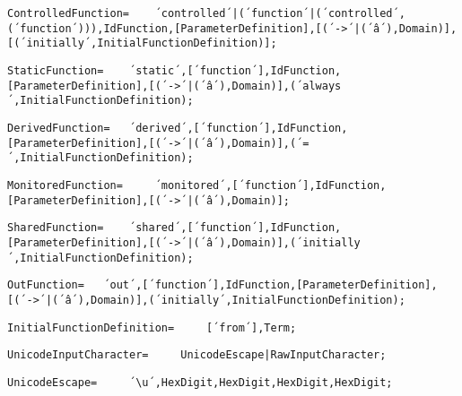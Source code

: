 \documentclass{article}
\begin{document}
    \begin{lstlisting}[mathescape=true]
     ControlledFunction= 	´controlled´|(´function´|(´controlled´,(´function´))),IdFunction,[ParameterDefinition],[(´->´|(´â´),Domain)],[(´initially´,InitialFunctionDefinition)];
    \end{lstlisting}
    
    \begin{lstlisting}[mathescape=true]
     StaticFunction= 	´static´,[´function´],IdFunction,[ParameterDefinition],[(´->´|(´â´),Domain)],(´always´,InitialFunctionDefinition);
    \end{lstlisting}
    
    \begin{lstlisting}[mathescape=true]
     DerivedFunction= 	´derived´,[´function´],IdFunction,[ParameterDefinition],[(´->´|(´â´),Domain)],(´=´,InitialFunctionDefinition);
    \end{lstlisting}
    
    \begin{lstlisting}[mathescape=true]
     MonitoredFunction= 	´monitored´,[´function´],IdFunction,[ParameterDefinition],[(´->´|(´â´),Domain)];
    \end{lstlisting}
    
    \begin{lstlisting}[mathescape=true]
     SharedFunction= 	´shared´,[´function´],IdFunction,[ParameterDefinition],[(´->´|(´â´),Domain)],(´initially´,InitialFunctionDefinition);
    \end{lstlisting}
    
    \begin{lstlisting}[mathescape=true]
     OutFunction= 	´out´,[´function´],IdFunction,[ParameterDefinition],[(´->´|(´â´),Domain)],(´initially´,InitialFunctionDefinition);
    \end{lstlisting}
    
    \begin{lstlisting}[mathescape=true]
     InitialFunctionDefinition= 	[´from´],Term;
    \end{lstlisting}
    
    \begin{lstlisting}[mathescape=true]
     UnicodeInputCharacter= 	UnicodeEscape|RawInputCharacter;
    \end{lstlisting}
    
    \begin{lstlisting}[mathescape=true]
     UnicodeEscape= 	´\u´,HexDigit,HexDigit,HexDigit,HexDigit;
    \end{lstlisting}
    
\end{document}
